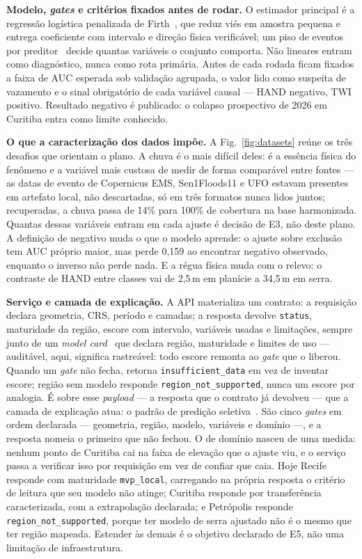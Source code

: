\documentclass[conference]{IEEEtran}
\begin{document}
\textbf{Modelo, \emph{gates} e critérios fixados antes de rodar.} O estimador
principal é a regressão logística penalizada de Firth~\cite{firth1993}, que reduz
viés em amostra pequena e entrega coeficiente com intervalo e direção física
verificável; um piso de eventos por preditor~\cite{peduzzi1996} decide quantas
variáveis o conjunto comporta. Não lineares entram como diagnóstico, nunca como
rota primária. Antes de cada rodada ficam fixados a faixa de AUC esperada sob
validação agrupada, o valor lido como suspeita de vazamento e o sinal obrigatório
de cada variável causal --- HAND negativo, TWI positivo. Resultado negativo é
publicado: o colapso prospectivo de 2026 em Curitiba entra como limite
conhecido.

\textbf{O que a caracterização dos dados impõe.} A Fig.~\ref{fig:datasets} reúne
os três desafios que orientam o plano. A chuva é o mais difícil deles: é a
essência física do fenômeno e a variável mais custosa de medir de forma
comparável entre fontes --- as datas de evento de Copernicus EMS,
Sen1Floods11 e UFO estavam presentes em artefato local, não descartadas, só
em três formatos nunca lidos juntos; recuperadas, a chuva passa de 14\% para
100\% de cobertura na base harmonizada. Quantas dessas variáveis entram em
cada ajuste é decisão de E3, não deste plano. A definição de negativo muda o
que o modelo aprende: o
ajuste sobre exclusão tem AUC próprio maior, mas perde 0,159 ao encontrar
negativo observado, enquanto o inverso não perde nada. E a régua física muda com
o relevo: o contraste de HAND entre classes vai de 2,5\,m em planície a
34,5\,m em serra.

\textbf{Serviço e camada de explicação.} A API materializa um contrato: a
requisição declara geometria, CRS, período e camadas; a resposta devolve
\texttt{status}, maturidade da região, escore com intervalo, variáveis usadas e
limitações, sempre junto de um \emph{model card}~\cite{mitchell2019} que declara
região, maturidade e limites de uso --- auditável, aqui, significa rastreável:
todo escore remonta ao \emph{gate} que o liberou. Quando um \emph{gate} não
fecha, retorna \texttt{insufficient\_data} em vez de inventar escore; região sem
modelo responde \texttt{region\_not\_supported}, nunca um escore por analogia. É
sobre esse \emph{payload} --- a resposta que o contrato já devolveu --- que a
camada de explicação atua: o padrão de predição seletiva~\cite{mitchell2019}. São
cinco \emph{gates} em ordem declarada --- geometria, região, modelo, variáveis e
domínio ---, e a resposta nomeia o primeiro que não fechou. O de domínio nasceu
de uma medida: nenhum ponto de Curitiba cai na faixa de elevação que o ajuste
viu, e o serviço passa a verificar isso por requisição em vez de confiar que
caia. Hoje Recife responde com maturidade \texttt{mvp\_local}, carregando na
própria resposta o critério de leitura que seu modelo não atinge; Curitiba
responde por transferência caracterizada, com a extrapolação declarada; e
Petrópolis responde \texttt{region\_not\_supported}, porque ter modelo de serra
ajustado não é o mesmo que ter região mapeada. Estender às demais é o objetivo
declarado de E5, não uma limitação de infraestrutura.
\end{document}
